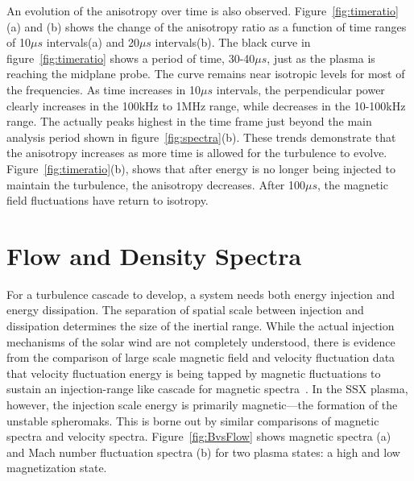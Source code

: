\documentclass[aip,prl,amsmath,amssymb,reprint,superscriptaddress]{revtex4-1} %
\begin{document}
An evolution of the anisotropy over time is also observed. Figure~\ref{fig:timeratio}(a) and (b) shows the change of the anisotropy ratio as a function of time ranges of 10$\mu s$ intervals(a) and 20$\mu s$ intervals(b). The black curve in figure~\ref{fig:timeratio} shows a period of time, 30-40$\mu s$, just as the plasma is reaching the midplane probe. The curve remains near isotropic levels for most of the frequencies. As time increases in 10$\mu s$ intervals, the perpendicular power clearly increases in the 100kHz to 1MHz range, while decreases in the 10-100kHz range. The actually peaks highest in the time frame just beyond the main analysis period shown in figure~\ref{fig:spectra}(b). These trends demonstrate that the anisotropy increases as more time is allowed for the turbulence to evolve. Figure~\ref{fig:timeratio}(b), shows that after energy is no longer being injected to maintain the turbulence, the anisotropy decreases. After 100$\mu s$, the magnetic field fluctuations have return to isotropy.

\section{Flow and Density Spectra}

For a turbulence cascade to develop, a system needs both energy injection and energy dissipation. The separation of spatial scale between injection and dissipation determines the size of the inertial range. While the actual injection mechanisms of the solar wind are not completely understood, there is evidence from the comparison of large scale magnetic field and velocity fluctuation data that velocity fluctuation energy is being tapped by magnetic fluctuations to sustain an injection-range like cascade for magnetic spectra~\cite{roberts10}. In the SSX plasma, however, the injection scale energy is primarily magnetic---the formation of the unstable spheromaks. This is borne out by similar comparisons of magnetic spectra and velocity spectra. Figure~\ref{fig:BvsFlow} shows magnetic spectra (a) and Mach number fluctuation spectra (b) for two plasma states: a high and low magnetization state.
\end{document}
